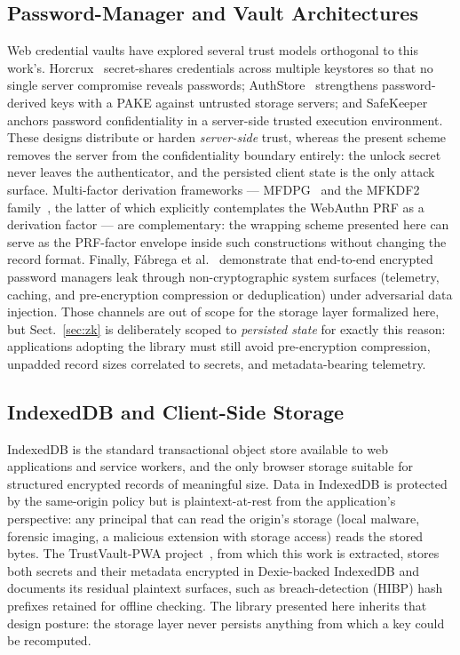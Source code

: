 \documentclass[runningheads]{llncs}
\begin{document}
\subsection{Password-Manager and Vault Architectures}
Web credential vaults have explored several trust models orthogonal to this work's.
Horcrux~\cite{horcrux} secret-shares credentials across multiple keystores so that no single server compromise reveals passwords; AuthStore~\cite{authstore} strengthens password-derived keys with a PAKE against untrusted storage servers; and SafeKeeper~\cite{safekeeper} anchors password confidentiality in a server-side trusted execution environment.
These designs distribute or harden \emph{server-side} trust, whereas the present scheme removes the server from the confidentiality boundary entirely: the unlock secret never leaves the authenticator, and the persisted client state is the only attack surface.
Multi-factor derivation frameworks --- MFDPG~\cite{mfdpg} and the MFKDF2 family~\cite{mfkdf2}, the latter of which explicitly contemplates the WebAuthn PRF as a derivation factor --- are complementary: the wrapping scheme presented here can serve as the PRF-factor envelope inside such constructions without changing the record format.
Finally, F\'{a}brega et al.~\cite{injection-attacks} demonstrate that end-to-end encrypted password managers leak through non-cryptographic system surfaces (telemetry, caching, and pre-encryption compression or deduplication) under adversarial data injection.
Those channels are out of scope for the storage layer formalized here, but Sect.~\ref{sec:zk} is deliberately scoped to \emph{persisted state} for exactly this reason: applications adopting the library must still avoid pre-encryption compression, unpadded record sizes correlated to secrets, and metadata-bearing telemetry.

\subsection{IndexedDB and Client-Side Storage}
IndexedDB is the standard transactional object store available to web applications and service workers, and the only browser storage suitable for structured encrypted records of meaningful size.
Data in IndexedDB is protected by the same-origin policy but is plaintext-at-rest from the application's perspective: any principal that can read the origin's storage (local malware, forensic imaging, a malicious extension with storage access) reads the stored bytes.
The TrustVault-PWA project~\cite{trustvault-security}, from which this work is extracted, stores both secrets and their metadata encrypted in Dexie-backed IndexedDB and documents its residual plaintext surfaces, such as breach-detection (HIBP) hash prefixes retained for offline checking.
The library presented here inherits that design posture: the storage layer never persists anything from which a key could be recomputed.
\end{document}

